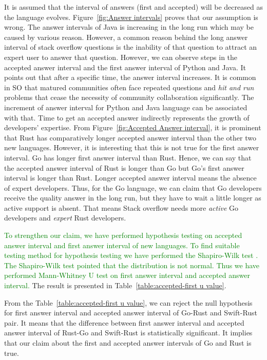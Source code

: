 It is assumed that the interval of answers (first and accepted) will be decreased as the language evolves. Figure~\ref{fig:Answer intervals} proves that our assumption is wrong. The answer intervals of Java is increasing in the long run which may be caused by various reason. However, a common reason behind the long answer interval of  stack overflow questions is the inability of that question to attract an expert user to answer that question\citep{Asaduzzaman2013}. However, we can observe steps in the accepted answer interval and the first answer interval of Python and Java. It points out that after a specific time, the answer interval increases. It is common in SO that matured communities often face repeated questions and \emph{hit and run}\citep{DBLP:journals/corr/ChengDL14,SO:decay} problems that cease the necessity of  community collaboration significantly. The increment of answer interval for Python and Java language can be associated with that.
Time to get an accepted answer indirectly represents the growth of developers' expertise. From Figure~\ref{fig:Accepted Answer interval}, it is prominent that Rust has comparatively longer accepted answer interval than the other two new languages. However, it is interesting that this is not true for the first answer interval. Go has longer first answer interval than Rust. Hence, we can say that the accepted answer interval of Rust is longer than Go but Go's first answer interval is longer than Rust. Longer accepted answer interval means the absence of expert developers. Thus, for the Go language, we can claim that Go developers receive the quality answer in the long run, but they have to wait a little longer as active support is absent. That means Stack overflow needs more \emph{active} Go developers and \emph{expert} Rust developers.


\textcolor{green}{To strengthen our claim, we have performed hypothesis testing on accepted answer interval and first answer interval of new languages. To find suitable testing method for hypothesis testing we have performed the Shapiro-Wilk test \citep{SHAPIRO1965}. The Shapiro-Wilk test pointed that the distribution is not normal. Thus we have performed Mann-Whitney U test on first answer interval and accepted answer interval.} The result is presented in Table~\ref{table:accepted-first u value}.

From the Table~\ref{table:accepted-first u value}, we can reject the null hypothesis for first answer interval and accepted answer interval of Go-Rust and Swift-Rust pair. It means that the difference between first answer interval and accepted answer interval of Rust-Go and Swift-Rust is statistically significant. It implies that our claim about the first and accepted answer intervals of Go and Rust is true.



